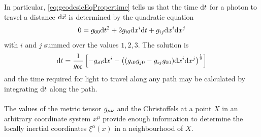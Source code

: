 In particular, \ref{eq:geodesicEqPropertime} tells us that the time $\mathrm{d} t$ for a photon to travel a distance $\mathrm{d} \vec{x}$ is determined by the quadratic equation
\begin{equation}
	0 = g_{00} \mathrm{d} t^2 + 2 g_{i 0} \mathrm{d} x^i \mathrm{d} t+ g_{ij} \mathrm{d} x^i \mathrm{d} x^j
\end{equation}
with $i$ and $j$ summed over the values $1,2,3$. The solution is
\begin{equation}
	\mathrm{d} t = \frac{1}{g_{00}} \left[-g_{i0} \mathrm{d} x^i - \left((g_{i0} g_{j0} - g_{ij}g_{00}) \mathrm{d} x^i \mathrm{d} x^j\right)^{\frac{1}{2}}\right]
\end{equation}
and the time required for light to travel along any path may be calculated by integrating $\mathrm{d} t$ along the path.\\
\\
The values of the metric tensor $g_{\mu \nu}$ and the Christoffels at a point $X$ in an arbitrary coordinate system $x^\mu$ provide enough information to determine the  locally inertial coordinates $\xi^\alpha(x)$ in a neighbourhood of $X$.
